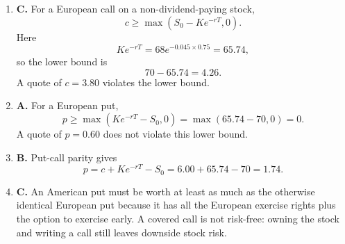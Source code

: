\documentclass[11pt]{article}
\begin{document}
\begin{enumerate}[label=\textbf{5.\arabic*.}]
    \item \textbf{C.} For a European call on a non-dividend-paying stock,
    \[
        c\geq \max(S_0-Ke^{-rT},0).
    \]
    Here
    \[
        Ke^{-rT}=68e^{-0.045\times0.75}=65.74,
    \]
    so the lower bound is
    \[
        70-65.74=4.26.
    \]
    A quote of $c=3.80$ violates the lower bound.

    \item \textbf{A.} For a European put,
    \[
        p\geq \max(Ke^{-rT}-S_0,0)
        =\max(65.74-70,0)
        =0.
    \]
    A quote of $p=0.60$ does not violate this lower bound.

    \item \textbf{B.} Put-call parity gives
    \[
        p=c+Ke^{-rT}-S_0
        =6.00+65.74-70
        =1.74.
    \]

    \item \textbf{C.} An American put must be worth at least as much as the
    otherwise identical European put because it has all the European exercise
    rights plus the option to exercise early. A covered call is not risk-free:
    owning the stock and writing a call still leaves downside stock risk.
\end{enumerate}
\end{document}
